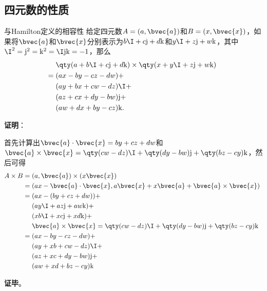 \subsection{四元数的性质}



\begin{lemma}{与Hamilton定义的相容性}
给定四元数$A=(a, \bvec{a})$和$B=(x, \bvec{x})$，如果将$\bvec{a}$和$\bvec{x}$分别表示为$b\I+c\mathrm{j}+d\mathrm{k}$和$y\I+z\mathrm{j}+w\mathrm{k}$，其中$\I^2=\mathrm{j}^2=\mathrm{k}^2=\I\mathrm{j}\mathrm{k}=-1$，那么
\begin{equation}
    \begin{aligned}
        &\qty(a+b\I+c\mathrm{j}+d\mathrm{k})\times\qty(x+y\I+z\mathrm{j}+w\mathrm{k})\\
        ={}& (ax-by-cz-dw)+\\
        &(ay+bx+cw-dz)\I+\\
        &(az+cx+dy-bw)\mathrm{j}+\\
        &(aw+dx+by-cz)\mathrm{k}. 
    \end{aligned}~
\end{equation}
\end{lemma}


\textbf{证明}：

首先计算出$\bvec{a}\cdot\bvec{x}=by+cz+dw$和$\bvec{a}\times \bvec{x}=\qty(cw-dz)\I+\qty(dy-bw)\mathrm{j}+\qty(bz-cy)\mathrm{k}$，然后可得
\begin{equation}
\begin{aligned}
A\times B ={}& (a, \bvec{a})\times(x\bvec{x})\\
={}& (ax-\bvec{a}\cdot\bvec{x}, a\bvec{x}+x\bvec{a}+\bvec{a}\times\bvec{x})\\
={}& (ax-(by+cz+dw))+\\
   & (ay\I+az\mathrm{j}+aw\mathrm{k})+\\
   & (xb\I+xc\mathrm{j}+xd\mathrm{k})+\\
   & \bvec{a}\times \bvec{x}=\qty(cw-dz)\I+\qty(dy-bw)\mathrm{j}+\qty(bz-cy)\mathrm{k}\\
={}& (ax-by-cz-dw)+\\
   & (ay+xb+cw-dz)\I+\\
   & (az+xc+dy-bw)\mathrm{j}+\\
   & (aw+xd+bz-cy)\mathrm{k}
\end{aligned}~
\end{equation}


\textbf{证毕}。





